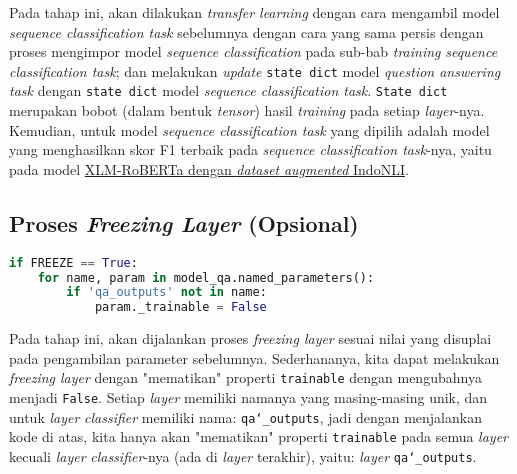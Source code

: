 Pada tahap ini, akan dilakukan \emph{transfer learning} dengan cara mengambil model \emph{sequence classification task} sebelumnya dengan cara yang sama persis dengan proses mengimpor model \emph{sequence classification} pada sub-bab \emph{training} \emph{sequence classification task}; dan melakukan \emph{update} \texttt{state dict} model \emph{question answering task} dengan \texttt{state dict} model \emph{sequence classification task}. \texttt{State dict} merupakan bobot (dalam bentuk \emph{tensor}) hasil \emph{training} pada setiap \emph{layer}-nya. Kemudian, untuk model \emph{sequence classification task} yang dipilih adalah model yang menghasilkan skor F1 terbaik pada \emph{sequence classification task}-nya, yaitu pada model \href{https://huggingface.co/muhammadravi251001/fine-tuned-IndoNLI-Augmented-with-xlm-roberta-large-LR-1e-05}{XLM-RoBERTa dengan \emph{dataset} \emph{augmented} IndoNLI}.

\subsection{Proses \emph{Freezing Layer} (Opsional)}

\begin{lstlisting}[language=Python, caption=Proses \emph{freezing layer} (opsional)]
if FREEZE == True:
    for name, param in model_qa.named_parameters():
        if 'qa_outputs' not in name:
            param._trainable = False
\end{lstlisting}

Pada tahap ini, akan dijalankan proses \emph{freezing layer} sesuai nilai yang disuplai pada pengambilan parameter sebelumnya. Sederhananya, kita dapat melakukan \emph{freezing layer} dengan "mematikan" properti \texttt{trainable} dengan mengubahnya menjadi \texttt{False}. Setiap \emph{layer} memiliki namanya yang masing-masing unik, dan untuk \emph{layer} \emph{classifier} memiliki nama: \texttt{qa\char`_outputs}, jadi dengan menjalankan kode di atas, kita hanya akan "mematikan" properti \texttt{trainable} pada semua \emph{layer} kecuali \emph{layer} \emph{classifier}-nya (ada di \emph{layer} terakhir), yaitu: \emph{layer} \texttt{qa\char`_outputs}.

